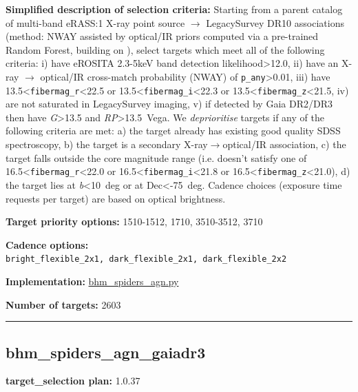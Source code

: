 \noindent\textbf{Simplified description of selection criteria:} Starting from a
parent catalog of multi-band eRASS:1 X-ray point source $\rightarrow$ LegacySurvey
DR10 associations (method: NWAY assisted by optical/IR priors computed
via a pre-trained Random Forest, building on
\citealt{Salvato2022}), select targets which meet all of the following criteria:
i) have eROSITA 2.3-5keV band detection likelihood\textgreater12.0, ii)
have an X-ray $\rightarrow$ optical/IR cross-match probability (NWAY) of
\texttt{p\_any}\textgreater0.01, iii) have
13.5\textless{}\texttt{fibermag\_r}\textless22.5 or
13.5\textless{}\texttt{fibermag\_i}\textless22.3 or
13.5\textless{}\texttt{fibermag\_z}\textless21.5, iv) are not saturated
in LegacySurvey imaging, v) if detected by Gaia DR2/DR3 then have
\emph{G}\textgreater13.5 and \emph{RP}\textgreater13.5~Vega. We
\emph{deprioritise} targets if any of the following criteria are met: a)
the target already has existing good quality SDSS spectroscopy, b) the
target is a secondary X-ray$\rightarrow$optical/IR association, c) the target falls
outside the core magnitude range (i.e. doesn't satisfy one of
16.5\textless{}\texttt{fibermag\_r}\textless22.0 or
16.5\textless{}\texttt{fibermag\_i}\textless21.8 or
16.5\textless{}\texttt{fibermag\_z}\textless21.0), d) the target lies at
\textbar{}\emph{b}\textbar\textless10~deg or at Dec\textless-75~deg.
Cadence choices (exposure time requests per target) are based on optical
brightness.


\noindent\textbf{Target priority options:} 1510-1512, 1710, 3510-3512, 3710

\noindent\textbf{Cadence options:}
\texttt{bright\_flexible\_2x1,\ dark\_flexible\_2x1,\ dark\_flexible\_2x2}

\noindent\textbf{Implementation:}
\href{https://github.com/sdss/target_selection/blob/1.0.37/python/target_selection/cartons/bhm_spiders_agn.py}{bhm\_spiders\_agn.py}

\noindent\textbf{Number of targets:} 2603

\begin{center}\rule{0.5\linewidth}{0.5pt}\end{center}

\hypertarget{bhm_spiders_agn_gaiadr3_plan1.0.37}{%
\subsection{bhm\_spiders\_agn\_gaiadr3}\label{bhm_spiders_agn_gaiadr3_plan1.0.37}}

\noindent\textbf{target\_selection plan:} 1.0.37

